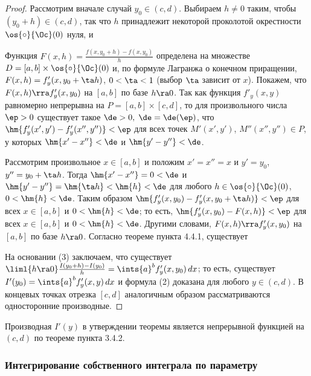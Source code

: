 \documentclass[a4paper]{article}
\begin{document}
\begin{proof}
Рассмотрим вначале случай $y_0\in(c,d)$. Выбираем $h\ne0$ таким,
чтобы $(y_0+h)\in(c,d)$, так что $h$ принадлежит некоторой
проколотой окрестности $\os{\circ}{\Oc}(0)$ нуля, и

Функция $F(x,h)=\frac{f(x,y_0+h)-f(x,y_0)}h$ определена на множестве
$D=[a,b]\times \os{\circ}{\Oc}(0)$ и, по формуле Лагранжа о конечном
приращении, $F(x,h)=f'_y(x,y_0+\ta h)$, $0<\ta<1$ (выбор $\ta$
зависит от $x$). Покажем, что $F(x,h)\rra f'_y(x,y_0)$ на $[a,b]$ по
базе $h\ra0$. Так как функция $f'_y(x,y)$ равномерно непрерывна на
$P=[a,b]\times[c,d]$, то для произвольного числа $\ep>0$ существует
такое $\de>0, \; \de=\de(\ep)$, что $\hm{f'_y(x',y') -
f'_y(x'',y'')}<\ep$ для всех точек $M'(x',y')$, $M''(x'',y'')\in P$,
у которых $\hm{x'-x''}<\de$ и $\hm{y'-y''}<\de$.

Рассмотрим произвольное $x\in[a,b]$ и положим $x'=x''=x$ и $y'=y_0$,
$y''=y_0+\ta h$. Тогда $\hm{x'-x''}=0<\de$ и $\hm{y'-y''} = \hm{\ta
h} < \hm{h} < \de$ для любого $h\in\os{\circ}{\Oc}(0)$,
$0<\hm{h}<\de$. Таким образом $\hm{f'_y(x,y_0) - f'_y(x,y_0+\ta
h)}<\ep$ для всех $x\in[a,b]$ и $0<\hm{h}<\de$; то есть,
$\hm{f'_y(x,y_0) - F(x,h)}<\ep$ для всех $x\in[a,b]$ и
$0<\hm{h}<\de$. Другими словами, $F(x,h)\rra f'_y(x,y_0)$ на $[a,b]$
по базе $h\ra0$. Согласно теореме пункта 4.4.1, существует

На основании (3) заключаем, что существует $\liml{h\ra0}
\frac{I(y_0+h) - I(y_0)}h = \ints{a}^b f'_y(x,y_0)\,dx$; то есть,
существует $I'(y_0) = \ints{a}^b f'_y(x,y)\,dx$ и формула (2)
доказана для любого $y\in(c,d)$. В концевых точках отрезка $[c,d]$
аналогичным образом рассматриваются односторонние производные.
\end{proof}

\begin{note}
Производная $I'(y)$ в утверждении теоремы является непрерывной
функцией на $(c,d)$ по теореме пункта 3.4.2.
\end{note}

\subsubsection{Интегрирование собственного интеграла по параметру}
\end{document}
